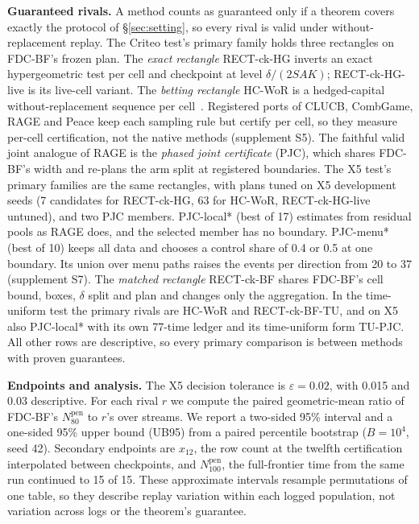 \documentclass[sigconf,anonymous,review]{acmart}
\newcommand{\eps}{\varepsilon}
\newcommand{\Npen}{N_{80}^{\text{pen}}}
\begin{document}
\textbf{Guaranteed rivals.} A method counts as guaranteed only if a theorem covers exactly the protocol of \S\ref{sec:setting}, so every rival is valid under without-replacement replay. The Criteo test's primary family holds three rectangles on FDC-BF's frozen plan. The \emph{exact rectangle} RECT-ck-HG inverts an exact hypergeometric test per cell and checkpoint at level $\delta/(2SAK)$; RECT-ck-HG-live is its live-cell variant. The \emph{betting rectangle} HC-WoR is a hedged-capital without-replacement sequence per cell~\citep{waudbysmith2020confidence,waudbysmith2024estimating}. Registered ports of CLUCB, CombGame, RAGE and Peace keep each sampling rule but certify per cell, so they measure per-cell certification, not the native methods (supplement S5). The faithful valid joint analogue of RAGE is the \emph{phased joint certificate} (PJC), which shares FDC-BF's width and re-plans the arm split at registered boundaries. The X5 test's primary families are the same rectangles, with plans tuned on X5 development seeds (7 candidates for RECT-ck-HG, 63 for HC-WoR, RECT-ck-HG-live untuned), and two PJC members. PJC-local* (best of 17) estimates from residual pools as RAGE does, and the selected member has no boundary. PJC-menu* (best of 10) keeps all data and chooses a control share of 0.4 or 0.5 at one boundary. Its union over menu paths raises the events per direction from 20 to 37 (supplement S7). The \emph{matched rectangle} RECT-ck-BF shares FDC-BF's cell bound, boxes, $\delta$ split and plan and changes only the aggregation. In the time-uniform test the primary rivals are HC-WoR and RECT-ck-BF-TU, and on X5 also PJC-local* with its own 77-time ledger and its time-uniform form TU-PJC. All other rows are descriptive, so every primary comparison is between methods with proven guarantees.

\textbf{Endpoints and analysis.} The X5 decision tolerance is $\eps = 0.02$, with 0.015 and 0.03 descriptive. For each rival $r$ we compute the paired geometric-mean ratio of FDC-BF's $\Npen$ to $r$'s over streams. We report a two-sided 95\% interval and a one-sided 95\% upper bound (UB95) from a paired percentile bootstrap ($B = 10^4$, seed 42). Secondary endpoints are $x_{12}$, the row count at the twelfth certification interpolated between checkpoints, and $N_{100}^{\text{pen}}$, the full-frontier time from the same run continued to 15 of 15. These approximate intervals resample permutations of one table, so they describe replay variation within each logged population, not variation across logs or the theorem's guarantee.
\end{document}

